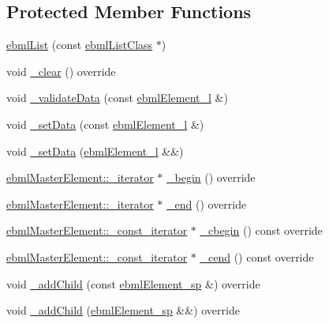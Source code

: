 \subsection*{Protected Member Functions}
\begin{DoxyCompactItemize}
\item 
\mbox{\hyperlink{classebml_1_1ebmlList_a8df16a98de7ff5cd9512840b908b1247}{ebml\+List}} (const \mbox{\hyperlink{classebml_1_1ebmlListClass}{ebml\+List\+Class}} $\ast$)
\item 
void \mbox{\hyperlink{classebml_1_1ebmlList_a2e57019d123e9647b47148c6f827cbed}{\+\_\+clear}} () override
\item 
void \mbox{\hyperlink{classebml_1_1ebmlList_a438c83de7e7fe38aced71d9ad27d29b9}{\+\_\+validate\+Data}} (const \mbox{\hyperlink{namespaceebml_a1ddadd26791f273d851882653b9caf70}{ebml\+Element\+\_\+l}} \&)
\item 
void \mbox{\hyperlink{classebml_1_1ebmlList_a366d78242b59ec90774774cd278e5863}{\+\_\+set\+Data}} (const \mbox{\hyperlink{namespaceebml_a1ddadd26791f273d851882653b9caf70}{ebml\+Element\+\_\+l}} \&)
\item 
void \mbox{\hyperlink{classebml_1_1ebmlList_af612aabfde64c4ef1c93ad7c16e76aa5}{\+\_\+set\+Data}} (\mbox{\hyperlink{namespaceebml_a1ddadd26791f273d851882653b9caf70}{ebml\+Element\+\_\+l}} \&\&)
\item 
\mbox{\hyperlink{classebml_1_1ebmlMasterElement_1_1__iterator}{ebml\+Master\+Element\+::\+\_\+iterator}} $\ast$ \mbox{\hyperlink{classebml_1_1ebmlList_a95b8de53fe3688ba73ee488e8ca94566}{\+\_\+begin}} () override
\item 
\mbox{\hyperlink{classebml_1_1ebmlMasterElement_1_1__iterator}{ebml\+Master\+Element\+::\+\_\+iterator}} $\ast$ \mbox{\hyperlink{classebml_1_1ebmlList_aec7a5554e1d10fd7575104471cb2c6f4}{\+\_\+end}} () override
\item 
\mbox{\hyperlink{classebml_1_1ebmlMasterElement_1_1__const__iterator}{ebml\+Master\+Element\+::\+\_\+const\+\_\+iterator}} $\ast$ \mbox{\hyperlink{classebml_1_1ebmlList_a7f215c99205ac37681fe7314463171bc}{\+\_\+cbegin}} () const override
\item 
\mbox{\hyperlink{classebml_1_1ebmlMasterElement_1_1__const__iterator}{ebml\+Master\+Element\+::\+\_\+const\+\_\+iterator}} $\ast$ \mbox{\hyperlink{classebml_1_1ebmlList_abfda97c7cfa6ab0328b444b7ae832b64}{\+\_\+cend}} () const override
\item 
void \mbox{\hyperlink{classebml_1_1ebmlList_aafcb7a3112a89b0bdde898b84ee44ec5}{\+\_\+add\+Child}} (const \mbox{\hyperlink{namespaceebml_adad533b7705a16bb360fe56380c5e7be}{ebml\+Element\+\_\+sp}} \&) override
\item 
void \mbox{\hyperlink{classebml_1_1ebmlList_a372e75614d5c93b7d7a55548c45c2d2f}{\+\_\+add\+Child}} (\mbox{\hyperlink{namespaceebml_adad533b7705a16bb360fe56380c5e7be}{ebml\+Element\+\_\+sp}} \&\&) override
\end{DoxyCompactItemize}
